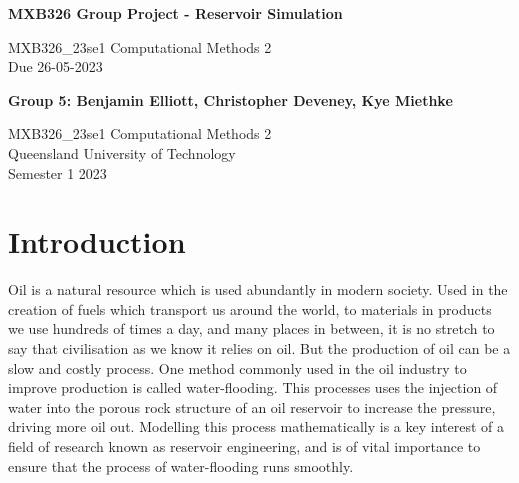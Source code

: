 \documentclass[11pt]{article}
\begin{document}

\begin{titlepage}
   \begin{center}
       \vspace*{6cm}

       \begin{large}\textbf{MXB326 Group Project - Reservoir Simulation}\end{large}

       \vspace{0.5cm}
        MXB326\_23se1 Computational Methods 2\\
        Due 26-05-2023
            
       \vspace{1.5cm}

       \textbf{Group 5: Benjamin Elliott, Christopher Deveney, Kye Miethke}

       \vfill
            
       MXB326\_23se1 Computational Methods 2\\
       Queensland University of Technology\\
       Semester 1 2023
            
   \end{center}
\end{titlepage}
\newpage


\tableofcontents
\newpage
{}


\section{Introduction}
Oil is a natural resource which is used abundantly in modern society. Used in the creation of fuels which transport us around the world, to materials in products we use hundreds of times a day, and many places in between, it is no stretch to say that civilisation as we know it relies on oil. But the production of oil can be a slow and costly process. One method commonly used in the oil industry to improve production is called water-flooding. This processes uses the injection of water into the porous rock structure of an oil reservoir to increase the pressure, driving more oil out. Modelling this process mathematically is a key interest of a field of research known as reservoir engineering, and is of vital importance to ensure that the process of water-flooding runs smoothly.\\
\end{document}

